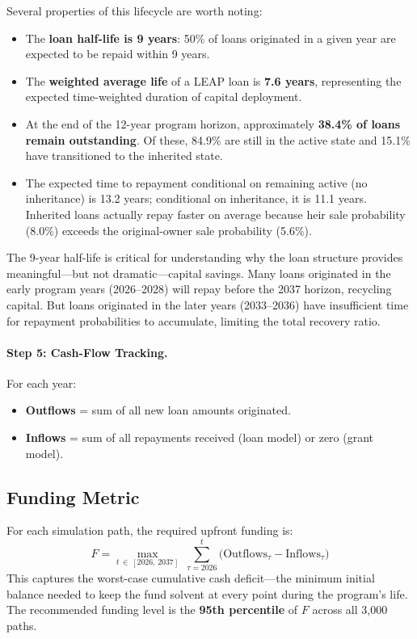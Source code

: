 \documentclass[11pt, letterpaper]{article}
\begin{document}
Several properties of this lifecycle are worth noting:

\begin{itemize}[nosep]
  \item The \textbf{loan half-life is 9 years}: 50\% of loans originated in a given year are expected to be repaid within 9 years.
  \item The \textbf{weighted average life} of a LEAP loan is \textbf{7.6 years}, representing the expected time-weighted duration of capital deployment.
  \item At the end of the 12-year program horizon, approximately \textbf{38.4\% of loans remain outstanding}. Of these, 84.9\% are still in the active state and 15.1\% have transitioned to the inherited state.
  \item The expected time to repayment conditional on remaining active (no inheritance) is 13.2 years; conditional on inheritance, it is 11.1 years. Inherited loans actually repay faster on average because heir sale probability (8.0\%) exceeds the original-owner sale probability (5.6\%).
\end{itemize}

The 9-year half-life is critical for understanding why the loan structure provides meaningful---but not dramatic---capital savings. Many loans originated in the early program years (2026--2028) will repay before the 2037 horizon, recycling capital. But loans originated in the later years (2033--2036) have insufficient time for repayment probabilities to accumulate, limiting the total recovery ratio.

\paragraph{Step 5: Cash-Flow Tracking.} For each year:
\begin{itemize}[nosep]
  \item \textbf{Outflows} = sum of all new loan amounts originated.
  \item \textbf{Inflows} = sum of all repayments received (loan model) or zero (grant model).
\end{itemize}

\subsection{Funding Metric}

For each simulation path, the required upfront funding is:
\begin{equation}
  F = \max_{t \,\in\, [2026,\, 2037]} \;\sum_{\tau=2026}^{t} \Big(\text{Outflows}_\tau - \text{Inflows}_\tau\Big)
\end{equation}
This captures the worst-case cumulative cash deficit---the minimum initial balance needed to keep the fund solvent at every point during the program's life. The recommended funding level is the \textbf{95th percentile} of $F$ across all 3{,}000 paths.
\end{document}
